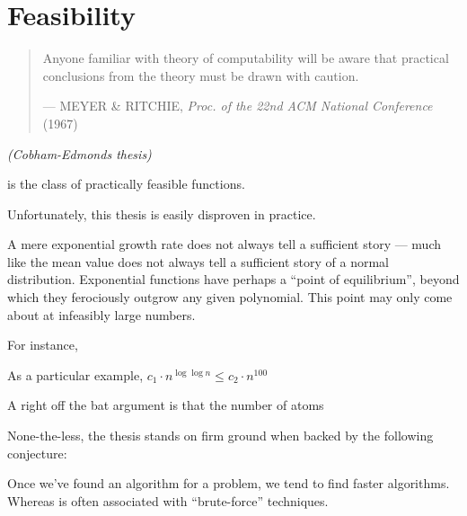 \chapter{Feasibility}

\begin{quotation}

\footnotesize\sffamily\itshape

\begin{flushright}

Anyone familiar with theory of computability will be aware that practical
conclusions from the theory must be drawn with caution.

\smallbreak

\upshape

--- MEYER \& RITCHIE, \emph{Proc. of the 22nd ACM National Conference} (1967)

\end{flushright}

\end{quotation}

\begin{hypothesis} \emph{(Cobham-Edmonds thesis)}

\FPTIME{} is the class of practically feasible functions.

\end{hypothesis}

Unfortunately, this thesis is easily disproven in practice.

A mere exponential growth rate does not always tell a sufficient story --- much
like the mean value does not always tell a sufficient story of a normal
distribution.  Exponential functions have perhaps a ``point of equilibrium'',
beyond which they ferociously outgrow any given polynomial. This point may only
come about at infeasibly large numbers.

For instance, 

As a particular example, $c_1 \cdot n^{\log\log{n}} \leq c_2 \cdot n^{100}$

A right off the bat argument is that the number of atoms

None-the-less, the thesis stands on firm ground when backed by the following conjecture:

Once we've found an \PTIME{} algorithm for a problem, we tend to find faster
algorithms. Whereas \NPTIME{} is often associated with ``brute-force''
techniques.

